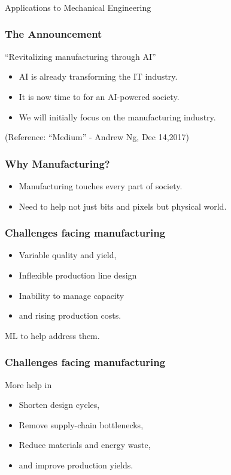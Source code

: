 \begin{frame}[fragile]\frametitle{}
\begin{center}
{\Large Applications to Mechanical Engineering}
\end{center}
\end{frame}

\begin{frame}[fragile]\frametitle{The Announcement}
\begin{center}
{\Large ``Revitalizing manufacturing through AI''}
\end{center}
\begin{itemize}
\item  AI is already transforming the IT industry.
\item It is now time to for an AI-powered society.
\item We will initially focus on the manufacturing industry.
\end{itemize}

\tiny{(Reference: ``Medium'' - Andrew Ng, Dec 14,2017)}
\end{frame}

\begin{frame}[fragile]\frametitle{Why Manufacturing?}
\begin{itemize}
\item  Manufacturing touches every part of society.
\item Need to help not just bits and pixels but physical world.
\end{itemize}

\end{frame}

\begin{frame}[fragile]\frametitle{Challenges facing manufacturing}
\begin{itemize}
\item  Variable quality and yield, 
\item Inflexible production line design
\item Inability to manage capacity
\item and rising production costs.
\end{itemize}
ML to help address them.
\end{frame}

\begin{frame}[fragile]\frametitle{Challenges facing manufacturing}
More help in
\begin{itemize}
\item  Shorten design cycles, 
\item Remove supply-chain bottlenecks, 
\item Reduce materials and energy waste, 
\item and improve production yields.
\end{itemize}

\end{frame}


